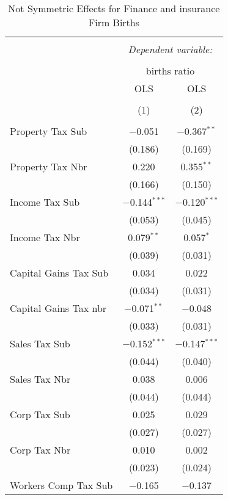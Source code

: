 
\begin{table}[!htbp] \centering 
  \caption{Not Symmetric Effects for  Finance and insurance Firm Births} 
  \label{52noequality} 
\begin{tabular}{@{\extracolsep{5pt}}lcc} 
\\[-1.8ex]\hline 
\hline \\[-1.8ex] 
 & \multicolumn{2}{c}{\textit{Dependent variable:}} \\ 
\cline{2-3} 
\\[-1.8ex] & \multicolumn{2}{c}{births ratio} \\ 
 & OLS & OLS \\ 
\\[-1.8ex] & (1) & (2)\\ 
\hline \\[-1.8ex] 
 Property Tax Sub & $-$0.051 & $-$0.367$^{**}$ \\ 
  & (0.186) & (0.169) \\ 
  Property Tax Nbr & 0.220 & 0.355$^{**}$ \\ 
  & (0.166) & (0.150) \\ 
  Income Tax Sub & $-$0.144$^{***}$ & $-$0.120$^{***}$ \\ 
  & (0.053) & (0.045) \\ 
  Income Tax Nbr & 0.079$^{**}$ & 0.057$^{*}$ \\ 
  & (0.039) & (0.031) \\ 
  Capital Gains Tax Sub & 0.034 & 0.022 \\ 
  & (0.034) & (0.031) \\ 
  Capital Gains Tax nbr & $-$0.071$^{**}$ & $-$0.048 \\ 
  & (0.033) & (0.031) \\ 
  Sales Tax Sub & $-$0.152$^{***}$ & $-$0.147$^{***}$ \\ 
  & (0.044) & (0.040) \\ 
  Sales Tax Nbr & 0.038 & 0.006 \\ 
  & (0.044) & (0.044) \\ 
  Corp Tax Sub & 0.025 & 0.029 \\ 
  & (0.027) & (0.027) \\ 
  Corp Tax Nbr & 0.010 & 0.002 \\ 
  & (0.023) & (0.024) \\ 
  Workers Comp Tax Sub & $-$0.165 & $-$0.137 \\ 

\end{tabular}
\end{table}

